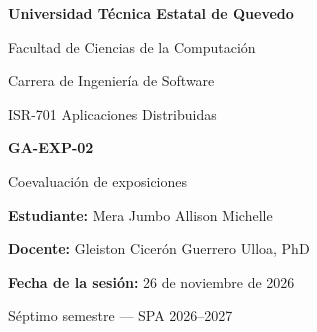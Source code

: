 \documentclass[11pt,a4paper]{article}
\newcommand{\estudiante}{Mera Jumbo Allison Michelle}
\newcommand{\fechasesion}{26 de noviembre de 2026}
\begin{document}
\begin{titlepage}
  \centering
  {\Large\bfseries Universidad Técnica Estatal de Quevedo\par}
  \vspace{0.3cm}
  {\large Facultad de Ciencias de la Computación\par}
  {\large Carrera de Ingeniería de Software\par}
  \vspace{2cm}
  {\large ISR-701 Aplicaciones Distribuidas\par}
  \vspace{0.5cm}
  {\Huge\bfseries GA-EXP-02\par}
  \vspace{0.3cm}
  {\LARGE Coevaluación de exposiciones\par}
  \vspace{2cm}
  {\large\textbf{Estudiante:} \estudiante\par}
  \vspace{0.3cm}
  {\large\textbf{Docente:} Gleiston Cicerón Guerrero Ulloa, PhD\par}
  \vspace{0.3cm}
  {\large\textbf{Fecha de la sesión:} \fechasesion\par}
  \vfill
  {\large Séptimo semestre --- SPA 2026--2027\par}
\end{titlepage}

\tableofcontents
\clearpage


%
%
\end{document}
